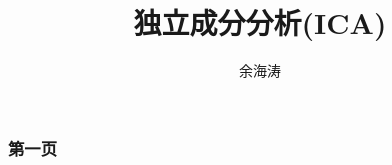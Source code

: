\documentclass[11pt]{beamer}
\begin{document}
\begin{CJK}{UTF8}{song}	


    \author{余海涛}
    \title{独立成分分析(ICA)}

\begin{frame}[plain]
    \maketitle
\end{frame}

\begin{frame}
    \frametitle{第一页}
\end{frame}



\end{CJK}
\end{document}
